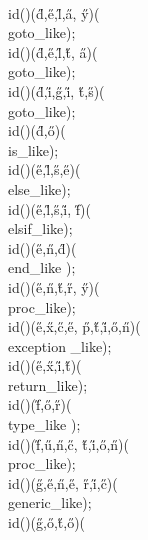 \\{id}\?\1(\?\2)\1(\?\H{d}\?,\?\H{e}\?,\?\H{l}\?,\?\H{a}\?,\?%
\H{y}\?\2)\1(\?\\{goto\_like}\?\2)\?;\6
\\{id}\?\1(\?\2)\1(\?\H{d}\?,\?\H{e}\?,\?\H{l}\?,\?\H{t}\?,\?%
\H{a}\?\2)\1(\?\\{goto\_like}\?\2)\?;\6
\\{id}\?\1(\?\2)\1(\?\H{d}\?,\?\H{i}\?,\?\H{g}\?,\?\H{i}\?,\?%
\H{t}\?,\?\H{s}\?\2)\1(\?\\{goto\_like}\?\2)\?;\6
\\{id}\?\1(\?\2)\1(\?\H{d}\?,\?\H{o}\?\2)\1(\?\\{is\_like}\?\2)\?;\6
\\{id}\?\1(\?\2)\1(\?\H{e}\?,\?\H{l}\?,\?\H{s}\?,\?\H{e}\?\2)\1(\?%
\\{else\_like}\?\2)\?;\6
\\{id}\?\1(\?\2)\1(\?\H{e}\?,\?\H{l}\?,\?\H{s}\?,\?\H{i}\?,\?%
\H{f}\?\2)\1(\?\\{elsif\_like}\?\2)\?;\6
\\{id}\?\1(\?\2)\1(\?\H{e}\?,\?\H{n}\?,\?\H{d}\?\2)\1(\?\\{end\_like}%
\?\2)\?;\6
\\{id}\?\1(\?\2)\1(\?\H{e}\?,\?\H{n}\?,\?\H{t}\?,\?\H{r}\?,\?%
\H{y}\?\2)\1(\?\\{proc\_like}\?\2)\?;\6
\\{id}\?\1(\?\2)\1(\?\H{e}\?,\?\H{x}\?,\?\H{c}\?,\?\H{e}\?,\?%
\H{p}\?,\?\H{t}\?,\?\H{i}\?,\?\H{o}\?,\?\H{n}\?\2)\1(\?\\{exception%
\_like}\?\2)\?;\6
\\{id}\?\1(\?\2)\1(\?\H{e}\?,\?\H{x}\?,\?\H{i}\?,\?\H{t}\?\2)\1(\?%
\\{return\_like}\?\2)\?;\6
\\{id}\?\1(\?\2)\1(\?\H{f}\?,\?\H{o}\?,\?\H{r}\?\2)\1(\?\\{type\_like}%
\?\2)\?;\6
\\{id}\?\1(\?\2)\1(\?\H{f}\?,\?\H{u}\?,\?\H{n}\?,\?\H{c}\?,\?%
\H{t}\?,\?\H{i}\?,\?\H{o}\?,\?\H{n}\?\2)\1(\?\\{proc\_like}\?\2)\?;\6
\\{id}\?\1(\?\2)\1(\?\H{g}\?,\?\H{e}\?,\?\H{n}\?,\?\H{e}\?,\?%
\H{r}\?,\?\H{i}\?,\?\H{c}\?\2)\1(\?\\{generic\_like}\?\2)\?;\6
\\{id}\?\1(\?\2)\1(\?\H{g}\?,\?\H{o}\?,\?\H{t}\?,\?\H{o}\?\2)\1(\?%
